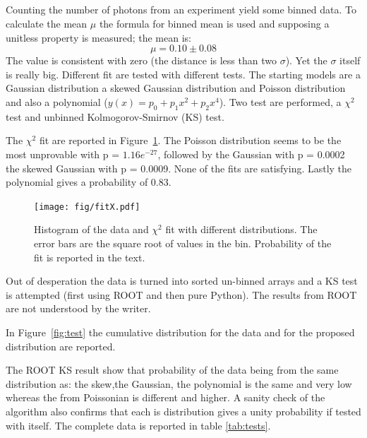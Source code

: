 \documentclass[twocolumn]{article}
\begin{document}
	\subsection{}
	\label{subs:photon}
		Counting the number of photons from an experiment yield some binned data.
		To calculate the mean $\mu$ the formula for binned mean is used and supposing  a unitless property is measured; the mean is:
		\begin{equation}
			 \mu = 0.10 \pm 0.08
		\end{equation}
		The value is consistent with zero (the distance is less than two  $\sigma$). Yet the $\sigma$ itself is really big.
		Different fit are tested with different tests. The starting models are a Gaussian distribution a skewed Gaussian distribution and Poisson distribution and also a polynomial ($y(x) =p_0 + p_1 x^2 + p_2x^4 $).
		Two test are performed, a $\chi ^2 $ test and  unbinned Kolmogorov-Smirnov (KS) test.

		The $\chi ^2 $ fit are reported in Figure~\ref{fig:fitX}. The Poisson distribution seems to be the most unprovable  with p = $1.16e^{-27}$, followed by the Gaussian with p = 0.0002 the skewed Gaussian with p = 0.0009. None of the fits are satisfying.
		Lastly the polynomial gives a probability of 0.83.
		\begin{figure}[h!]
			\begin{center}
				\texttt{[image: fig/fitX.pdf]}
			\end{center}
			\caption{Histogram of the data and $\chi ^2 $ fit with different distributions. The error bars are the square root of values in the bin. Probability of the fit is reported in the text.}
			\label{fig:fitX}
		\end{figure}

		Out of desperation the data is turned into sorted un-binned arrays and a KS test is attempted (first using ROOT and then pure Python).
		The results from ROOT are not understood by the writer.

		In Figure~\ref{fig:test} the cumulative distribution for the data and for the proposed distribution are reported.

		The  ROOT KS result show that probability of the data  being from the same distribution as: the skew,the Gaussian, the polynomial is the same and very low whereas the  from Poissonian is different and higher.
		A sanity check of the algorithm also confirms that each is distribution gives a unity probability if tested with itself.
		The complete data is reported in table \ref{tab:tests}.
\end{document}
